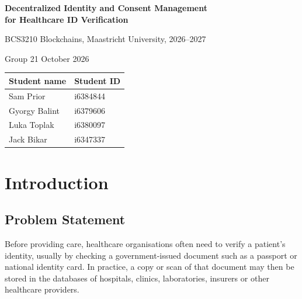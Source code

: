 \documentclass[10pt,a4paper]{article}
\begin{document}
\thispagestyle{empty}
\begin{center}
  \vspace*{0.5cm}
  {\LARGE\bfseries Decentralized Identity and Consent Management\\[4pt] for Healthcare ID Verification\par}
  \vspace{0.6cm}
  {\large BCS3210 Blockchains, Maastricht University, 2026--2027\par}
  \vspace{0.2cm}
  {\large Group 21 \quad October 2026\par}
  \vspace{0.6cm}
  \begin{tabular}{ll}
    \toprule
    \textbf{Student name} & \textbf{Student ID} \\
    \midrule
    Sam Prior     & i6384844 \\
    Gyorgy Balint & i6379606 \\
    Luka Toplak   & i6380097 \\
    Jack Bikar    & i6347337 \\
    \bottomrule
  \end{tabular}
\end{center}
\vspace{0.6cm}
\begin{singlespace}
\tableofcontents
\end{singlespace}
\clearpage

\setcounter{page}{1}
\doublespacing

\section{Introduction}

\subsection{Problem Statement}

Before providing care, healthcare organisations often need to verify a patient's identity, usually by checking a government-issued document such as a passport or national identity card. In practice, a copy or scan of that document may then be stored in the databases of hospitals, clinics, laboratories, insurers or other healthcare providers.
\end{document}
